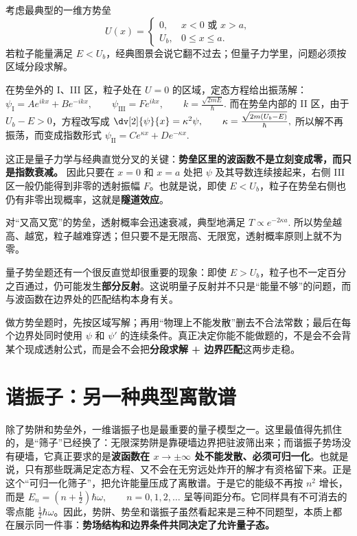 \documentclass[lang=cn,11pt]{elegantbook}
\begin{document}
考虑最典型的一维方势垒
\[
U(x)=
\begin{cases}
0, & x<0 \text{ 或 } x>a,\\
U_b, & 0\le x\le a.
\end{cases}
\]
若粒子能量满足 \(E<U_b\)，经典图景会说它翻不过去；但量子力学里，问题必须按区域分段求解。

在势垒外的 I、III 区，粒子处在 \(U=0\) 的区域，定态方程给出振荡解：
 \(\psi_{\mathrm{I}}=A e^{ikx}+B e^{-ikx}, \qquad \psi_{\mathrm{III}}=F e^{ikx}, \qquad k=\frac{\sqrt{2mE}}{\hbar}.\) 
而在势垒内部的 II 区，由于 \(U_b-E>0\)，方程改写成
 \(\dv[2]{\psi}{x}=\kappa^2\psi, \qquad \kappa=\frac{\sqrt{2m(U_b-E)}}{\hbar},\) 
所以解不再振荡，而变成指数形式
 \(\psi_{\mathrm{II}}=C e^{\kappa x}+D e^{-\kappa x}.\) 

这正是量子力学与经典直觉分叉的关键：\textbf{势垒区里的波函数不是立刻变成零，而只是指数衰减。} 因此只要在 \(x=0\) 和 \(x=a\) 处把 \(\psi\) 及其导数连续接起来，右侧 III 区一般仍能得到非零的透射振幅 \(F\)。也就是说，即使 \(E<U_b\)，粒子在势垒右侧也仍有非零出现概率，这就是\textbf{隧道效应}。

对“又高又宽”的势垒，透射概率会迅速衰减，典型地满足
 \(T\propto e^{-2\kappa a}.\) 
所以势垒越高、越宽，粒子越难穿透；但只要不是无限高、无限宽，透射概率原则上就不为零。

\begin{remark}
量子势垒题还有一个很反直觉却很重要的现象：即使 \(E>U_b\)，粒子也不一定百分之百通过，仍可能发生\textbf{部分反射}。这说明量子反射并不只是“能量不够”的问题，而与波函数在边界处的匹配结构本身有关。
\end{remark}

\begin{note}
做方势垒题时，先按区域写解；再用“物理上不能发散”删去不合法常数；最后在每个边界处同时使用 \(\psi\) 和 \(\psi'\) 的连续条件。真正决定你能不能做题的，不是会不会背某个现成透射公式，而是会不会把\textbf{分段求解 + 边界匹配}这两步走稳。
\end{note}

\section{谐振子：另一种典型离散谱}

除了势阱和势垒外，一维谐振子也是最重要的量子模型之一。这里最值得先抓住的，是“筛子”已经换了：无限深势阱是靠硬墙边界把驻波筛出来；而谐振子势场没有硬墙，它真正要求的是\textbf{波函数在 \(x\to\pm\infty\) 处不能发散、必须可归一化}。也就是说，只有那些既满足定态方程、又不会在无穷远处炸开的解才有资格留下来。正是这个“可归一化筛子”，把允许能量压成了离散谱。于是它的能级不再按 \(n^2\) 增长，而是
 \(E_n=\left(n+\frac12\right)\hbar\omega, \qquad n=0,1,2,\dots\) 
呈等间距分布。它同样具有不可消去的零点能 \(\frac12\hbar\omega\)。因此，势阱、势垒和谐振子虽然看起来是三种不同题型，本质上都在展示同一件事：\textbf{势场结构和边界条件共同决定了允许量子态。}
\end{document}
